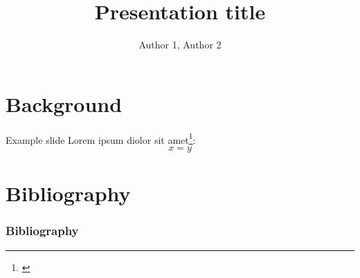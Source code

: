 \documentclass[11pt,aspectratio=169]{beamer}
\author[Author 1 (NJIT)]{Author 1, Author 2}
\title[Short title]{Presentation title}
\begin{document}
\begin{frame}
\titlepage
\end{frame}

\section{Background}

\begin{frame}{Example slide}
Lorem ipsum diolor sit amet\footnote{\cite{khalizov2009enhanced}}:
$$
    x=y
$$
\end{frame}

\section{Bibliography}

\begin{frame}[t,allowframebreaks]
\frametitle{Bibliography}
\printbibliography
\end{frame}
\end{document}
